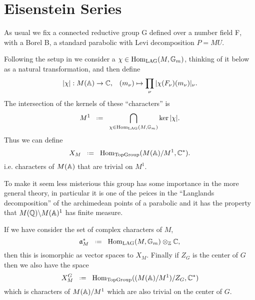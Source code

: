\section{Eisenstein Series}
As usual we fix a connected reductive group G defined over a number field F, with a Borel B, a standard parabolic with Levi decomposition \(P = MU\). 

Following the setup in \cite[I.1.4]{moeglinSpectralDecompositionEisenstein1995} we consider a \(\chi\in \operatorname{Hom}_{\mathrm{LAG}}(M, \mathbb{G}_m)\), thinking of it below as a natural transformation, and then define 
\[|\chi|: M(\A)\to \C , \;\;\; (m_\nu)\mapsto \prod_\nu|\chi(F_\nu)(m_\nu)|_\nu.\]
The intersection of the kernels of these ``characters'' is 
\[M^1 \defeq \bigcap_{\chi\in \Hom_{\mathrm{LAG}}(M, \mathbb{G}_m)}\ker |\chi|.\]
Thus we can define
\[X_M \defeq \Hom_{\textrm{TopGroup}}(M(\A)/M^1, \C^*) .\]
i.e. characters of \(M(\A)\) that are trivial on \(M^1\).
\begin{remark}
    To make it seem less misterious this group has some importance in the more general theory, in particular it is one of the peices in the ``Langlands decomposition'' of the archimedean points of a parabolic and it has the property that \(M(\Q)\backslash M(\A)^1\) has finite measure.\cite[4.9]{getzIntroductionAutomorphicRepresentations2024} 
\end{remark}
If we have consider the set of complex characters of \(M\),
\[\mathfrak{a}_M^* \defeq \Hom_{\mathrm{LAG}}(M, \mathbb{G}_m )\tensor_\Z \C,\]
then this is isomorphic as \C vector spaces to \(X_M\). Finally if \(Z_G\) is the center of \(G\) then we also have the space 
\[X_M^G \defeq \Hom_{\textrm{TopGroup}}((M(\A)/M^1)/Z_G, \C^*)\]
which is characters of \(M(\A)/M^1\) which are also trivial on the center of \(G\).

